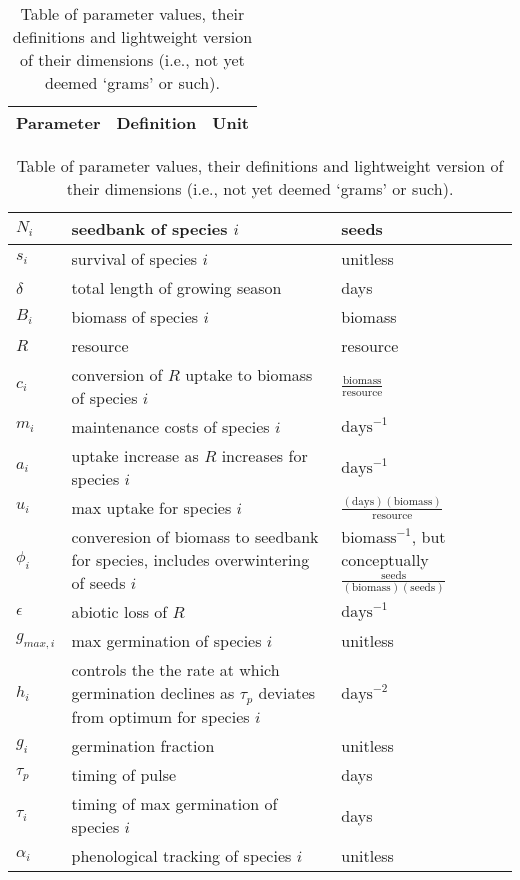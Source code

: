 \documentclass[11pt,a4paper,oneside]{article}
\begin{document}
\begin{center}
\begin{table}[h!]
\caption{Table of parameter values, their definitions and lightweight version of their dimensions (i.e., not yet deemed `grams' or such).}
\begin{tabular}{ | p{3.0cm} | p{6.0cm} | p{4.0cm} |}
\hline 
Parameter & Definition & Unit \\ \hline 
\end{tabular}
\begin{tabular}{ | p{3.0cm} | p{6.0cm} | p{4.0cm} |}
\(N_{i}\) & seedbank of species \(i\) & seeds \\ \hline
\(s_{i}\) & survival of species \(i\) & unitless \\ \hline
\(\delta\) & total length of growing season & days\\ \hline
\(B_{i}\) & biomass of species \(i\) & biomass \\ \hline
\(R\) & resource & resource\\ \hline
\(c_{i}\) & conversion of \(R\) uptake to biomass of species \(i\) &  \(\frac{\text{biomass}}{\text{resource}}\) \\ \hline
\(m_{i}\) & maintenance costs of species \(i\) & \(\text{days}^{-1}\) \\ \hline
\(a_{i}\) & uptake increase as \(R\) increases for species \(i\) & \(\text{days}^{-1}\) \\ \hline
\(u_{i}\) & max uptake for species \(i\) & \(\frac{(\text{days})(\text{biomass})}{\text{resource}}\) \\ \hline
\(\phi_{i}\) & converesion of biomass to seedbank for species, includes overwintering of seeds \(i\) & \(\text{biomass}^{-1}\), but conceptually \(\frac{\text{seeds}}{(\text{biomass})(\text{seeds})}\) \\ \hline
\(\epsilon\) & abiotic loss of \(R\) &  \(\text{days}^{-1}\) \\ \hline
\(g_{max,i}\) & max germination of species \(i\) & unitless \\ \hline
\(h_{i}\) &  controls the the rate at which germination declines as \(\tau_{p}\) deviates from optimum for species \(i\)  & \(\text{days}^{-2}\) \\ \hline
\(g_{i}\) & germination fraction & unitless \\ \hline
\(\tau_{p}\) & timing of pulse & days \\ \hline
\(\tau_{i}\) & timing of max germination of species \(i\) & days \\ \hline
\(\alpha_{i}\) & phenological tracking of species \(i\) & unitless \\ \hline

\end{tabular}
\end{table}
\end{center}
\end{document}
